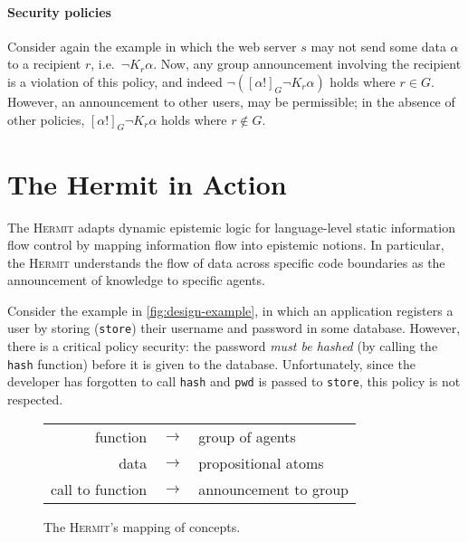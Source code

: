 \documentclass[letterpaper,twocolumn,10pt]{article}
\newcommand{\Hermit}{\textsc{Hermit}\xspace}
\begin{document}
\paragraph{Security policies}
Consider again the example in which the web server \(s\) may not send some data \(\alpha\) to a recipient \(r\), i.e.\ \(\lnot K_r \alpha\).
Now, any group announcement involving the recipient is a violation of this policy, and indeed \(\lnot ([\alpha!]_G \lnot K_r \alpha)\) holds where \(r \in G\).
However, an announcement to other users, may be permissible; in the absence of other policies, \([\alpha!]_G \lnot K_r \alpha\) holds where \(r \not\in G\).

\section{The Hermit in Action}
\label{sec:design}

The \Hermit adapts dynamic epistemic logic for language-level static information flow control by mapping information flow into epistemic notions.
In particular, the \Hermit understands the flow of data across specific code boundaries as the announcement of knowledge to specific agents.

Consider the example in \cref{fig:design-example}, in which an application registers a user by storing (\lstinline{store}) their username and password in some database.
However, there is a critical policy security: the password \emph{must be hashed} (by calling the \lstinline{hash} function) before it is given to the database.
Unfortunately, since the developer has forgotten to call \lstinline{hash} and \lstinline{pwd} is passed to \lstinline{store}, this policy is not respected.

\begin{figure}
  \centering
  \begin{tabular}{rcl}
    function & \(\rightarrow\) & group of agents \\
    data & \(\rightarrow\) & propositional atoms \\
    call to function & \(\rightarrow\) & announcement to group \\
  \end{tabular}
  \caption{The \Hermit's mapping of concepts.}
  \label{fig:design-concepts}
\end{figure}
\end{document}
